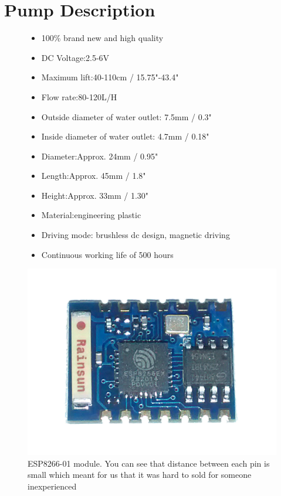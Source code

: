 \documentclass[a4paper,12pt,twoside,openright,titlepage]{book}
\begin{document}
\section{Pump Description}
\begin{figure}[ht!]
	\begin{itemize}
	\item 100\% brand new and high quality
	\item DC Voltage:2.5-6V
	\item Maximum lift:40-110cm / 15.75"-43.4"
	\item Flow rate:80-120L/H
	\item Outside diameter of water outlet: 7.5mm / 0.3"
	\item Inside diameter of water outlet: 4.7mm / 0.18"
	\item Diameter:Approx. 24mm / 0.95"
	\item Length:Approx. 45mm / 1.8"
	\item Height:Approx. 33mm / 1.30"
	\item Material:engineering plastic
	\item Driving mode: brushless dc design, magnetic driving
	\item Continuous working life of 500 hours
	\end{itemize}
	\label{fig:pump description}
\end{figure}


\begin{figure}[!ht]
	\centering
		\includegraphics[scale=0.20]{ESP-01}
	\caption{ESP8266-01 module. You can see that distance between each pin is small which meant for us that it was hard to sold for someone inexperienced}
	\label{fig:ESP}
\end{figure}
\end{document}

